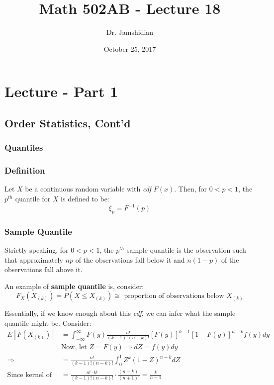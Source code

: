 \documentclass{article}
\title{Math 502AB - Lecture 18}
\author{Dr. Jamshidian}
\date{October 25, 2017}
\begin{document}
\maketitle

\section{Lecture - Part 1}

\subsection{Order Statistics, Cont'd}

\subsubsection{Quantiles}

\subsubsection*{Definition}

Let $X$ be a continuous random variable with \textit{cdf} $F(x)$. Then, for $0<p<1$, the $p^{th}$ quantile for $X$ is defined to be:
\begin{equation*}
    \xi_p = F^{-1}(p)
\end{equation*}


\subsubsection{Sample Quantile}

Strictly speaking, for $0<p<1$, the $p^{th}$ sample quantile is the observation such that approximately $np$ of the observations fall below it and $n(1-p)$ of the observations fall above it.

An example of \textbf{sample quantile} is, consider:
\begin{equation*}
    F_X\left(X_{(k)} \right) = P(X \leq X_{(k)}) \cong \text{ proportion of observations below $X_{(k)}$}
\end{equation*}

\noindent Essentially, if we know enough about this \textit{cdf}, we can infer what the sample quantile might be. Consider:
\begin{equation*}
    \begin{split}
        E\left[F\left(X_{(k)} \right)\right] &= \int_{-\infty}^\infty F(y) \frac{n!}{(k-1)!(n-k)!} [F(y)]^{k-1}[1-F(y)]^{n-k} f(y) dy\\
        &\text{Now, let } Z = F(y) \Rightarrow dZ = f(y) dy\\
        \Rightarrow &= \frac{n!}{(k-1)!(n-k)!} \int_0^1 Z^k(1-Z)^{n-k}dZ\\
        \text{Since kernel of Beta dist'n}\quad   &= \frac{n!\cdot k!}{(k-1)!(n-k)!} \cdot \frac{(n-k)!}{(n+1)!} = \frac{k}{n+1}
    \end{split}
\end{equation*}
\end{document}
